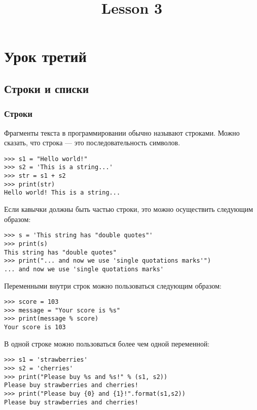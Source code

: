 \documentclass[11pt]{article}
\title{Lesson 3}
\begin{document}
    
    
    \maketitle
    
    

    
    \section{Урок
третий}\label{ux443ux440ux43eux43a-ux442ux440ux435ux442ux438ux439}

    \subsection{Строки и
списки}\label{ux441ux442ux440ux43eux43aux438-ux438-ux441ux43fux438ux441ux43aux438}

\subsubsection{Строки}\label{ux441ux442ux440ux43eux43aux438}

Фрагменты текста в программировании обычно называют строками. Можно
сказать, что строка --- это последовательность символов.

\begin{verbatim}
>>> s1 = "Hello world!" 
>>> s2 = 'This is a string...'
>>> str = s1 + s2
>>> print(str)
Hello world! This is a string...
\end{verbatim}

Если кавычки должны быть частью строки, это можно осуществить следующим
образом:

\begin{verbatim}
>>> s = 'This string has "double quotes"'
>>> print(s)
This string has "double quotes"
>>> print("... and now we use 'single quotations marks'")
... and now we use 'single quotations marks'
\end{verbatim}

Переменными внутри строк можно пользоваться следующим образом:

\begin{verbatim}
>>> score = 103
>>> message = "Your score is %s"
>>> print(message % score)
Your score is 103
\end{verbatim}

В одной строке можно пользоваться более чем одной переменной:

\begin{verbatim}
>>> s1 = 'strawberries'
>>> s2 = 'cherries'
>>> print("Please buy %s and %s!" % (s1, s2))
Please buy strawberries and cherries!
>>> print("Please buy {0} and {1}!".format(s1,s2))
Please buy strawberries and cherries!
\end{verbatim}
\end{document}

